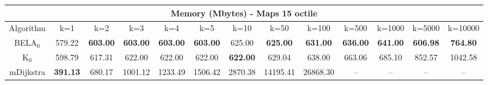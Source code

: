 \begin{tabular}{c|cccccccccccc}\toprule
\multicolumn{13}{c}{Memory (Mbytes) - Maps 15 octile}\\ \midrule
Algorithm & k=1 & k=2 & k=3 & k=4 & k=5 & k=10 & k=50 & k=100 & k=500 & k=1000 & k=5000 & k=10000 \\ \midrule
BELA$_0$ & 579.22 & \textbf{603.00} & \textbf{603.00} & \textbf{603.00} & \textbf{603.00} & 625.00 & \textbf{625.00} & \textbf{631.00} & \textbf{636.00} & \textbf{641.00} & \textbf{606.98} & \textbf{764.80} \\
K$_0$ & 598.79 & 617.31 & 622.00 & 622.00 & 622.00 & \textbf{622.00} & 629.04 & 638.00 & 663.06 & 685.10 & 852.57 & 1042.58 \\
mDijkstra & \textbf{391.13} & 680.17 & 1001.12 & 1233.49 & 1506.42 & 2870.38 & 14195.41 & 26868.30 & -- & -- & -- & -- \\ \bottomrule 
\end{tabular}
